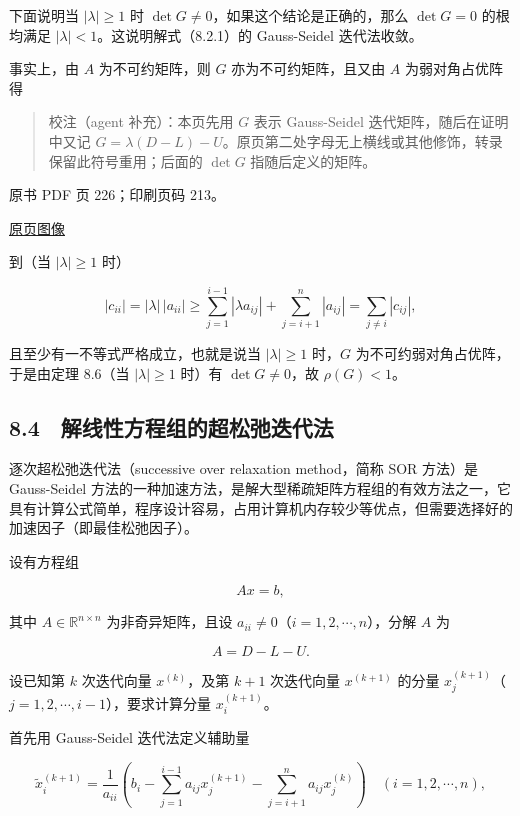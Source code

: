 下面说明当 \(|\lambda|\geqslant1\) 时 \(\det G\neq0\)，如果这个结论是正确的，那么 \(\det G=0\) 的根均满足 \(|\lambda|<1\)。这说明解式（8.2.1）的 Gauss-Seidel 迭代法收敛。

事实上，由 \(A\) 为不可约矩阵，则 \(G\) 亦为不可约矩阵，且又由 \(A\) 为弱对角占优阵得

\begin{quote}
校注（agent 补充）：本页先用 \(G\) 表示 Gauss-Seidel 迭代矩阵，随后在证明中又记 \(G=\lambda(D-L)-U\)。原页第二处字母无上横线或其他修饰，转录保留此符号重用；后面的 \(\det G\) 指随后定义的矩阵。
\end{quote}

\clearpage

原书 PDF 页 226；印刷页码 213。

\href{source-images/pdf-226.jpeg}{原页图像}

到（当 \(|\lambda|\geqslant1\) 时）

\[
|c_{ii}|=|\lambda|\,|a_{ii}|
\geqslant\sum_{j=1}^{i-1}|\lambda a_{ij}|+\sum_{j=i+1}^n|a_{ij}|
=\sum_{j\neq i}|c_{ij}|,
\]

且至少有一不等式严格成立，也就是说当 \(|\lambda|\geqslant1\) 时，\(G\) 为不可约弱对角占优阵，于是由定理 8.6（当 \(|\lambda|\geqslant1\) 时）有 \(\det G\neq0\)，故 \(\rho(G)<1\)。

\subsection{8.4　解线性方程组的超松弛迭代法}\label{ch08-ux89e3ux7ebfux6027ux65b9ux7a0bux7ec4ux7684ux8d85ux677eux5f1bux8fedux4ee3ux6cd5}

逐次超松弛迭代法（successive over relaxation method，简称 SOR 方法）是 Gauss-Seidel 方法的一种加速方法，是解大型稀疏矩阵方程组的有效方法之一，它具有计算公式简单，程序设计容易，占用计算机内存较少等优点，但需要选择好的加速因子（即最佳松弛因子）。

设有方程组

\[
Ax=b,
\tag{8.4.1}
\]

其中 \(A\in\mathbb R^{n\times n}\) 为非奇异矩阵，且设 \(a_{ii}\neq0\)（\(i=1,2,\cdots,n\)），分解 \(A\) 为

\[
A=D-L-U.
\tag{8.4.2}
\]

设已知第 \(k\) 次迭代向量 \(x^{(k)}\)，及第 \(k+1\) 次迭代向量 \(x^{(k+1)}\) 的分量 \(x_j^{(k+1)}\)（\(j=1,2,\cdots,i-1\)），要求计算分量 \(x_i^{(k+1)}\)。

首先用 Gauss-Seidel 迭代法定义辅助量

\[
\tilde{x}_i^{(k+1)}=\frac1{a_{ii}}\left(b_i-\sum_{j=1}^{i-1}a_{ij}x_j^{(k+1)}-\sum_{j=i+1}^{n}a_{ij}x_j^{(k)}\right)\quad(i=1,2,\cdots,n),
\tag{8.4.3}
\]

